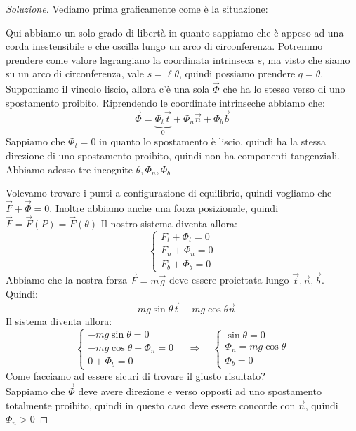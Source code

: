 \documentclass[11pt,a4paper,twoside]{article}
\theoremstyle{definition}
\newenvironment{sol}
	{\renewcommand\qedsymbol{$\blacksquare$}\begin{proof}[Soluzione]}
	{\end{proof}}
\begin{document}
\begin{sol}
	Vediamo prima graficamente come è la situazione:
	\begin{center}
	\end{center}
	Qui abbiamo un solo grado di libertà in quanto sappiamo che è appeso ad una corda inestensibile e che oscilla lungo un arco di circonferenza. Potremmo prendere come valore lagrangiano la coordinata intrinseca $s$, ma visto che siamo su un arco di circonferenza, vale $s = \ell \theta$, quindi possiamo prendere $q = \theta$. Supponiamo il vincolo liscio, allora c'è una sola $\vec \Phi$ che ha lo stesso verso di uno spostamento proibito. Riprendendo le coordinate intrinseche abbiamo che:
	\[ \vec \Phi = \underbrace{\Phi_t \vec t}_0 + \Phi_n \vec n + \Phi_b \vec b \]
	Sappiamo che $\Phi_t = 0$ in quanto lo spostamento è liscio, quindi ha la stessa direzione di uno spostamento proibito, quindi non ha componenti tangenziali. Abbiamo adesso tre incognite $\theta, \Phi_n, \Phi_b$

	Volevamo trovare i punti a configurazione di equilibrio, quindi vogliamo che $\vec F + \vec \Phi = 0$. Inoltre abbiamo anche una forza posizionale, quindi $\vec F = \vec F(P) = \vec F(\theta)$
	Il nostro sistema diventa allora:
	\[ \begin{cases}
		F_t + \Phi_t = 0\\
		F_n + \Phi_n = 0\\
		F_b + \Phi_b = 0
	\end{cases} \]
	Abbiamo che la nostra forza $\vec F = m\vec g$ deve essere proiettata lungo $\vec t, \vec n, \vec b$. Quindi:
	\[ -mg \sin \theta \vec t - mg \cos \theta \vec n \]
	Il sistema diventa allora:
	\[ \begin{cases}
		-mg\sin \theta = 0\\
		-mg \cos \theta + \Phi_n = 0\\
		0 + \Phi_b = 0
	\end{cases} \quad \Rightarrow \quad
	\begin{cases}
		\sin \theta = 0\\
		\Phi_n = mg \cos \theta\\
		\Phi_b =0
	\end{cases}\]
	Come facciamo ad essere sicuri di trovare il giusto risultato?\\
	Sappiamo che $\vec \Phi$ deve avere direzione e verso opposti ad uno spostamento totalmente proibito, quindi in questo caso deve essere concorde con $\vec n$, quindi $\Phi_n>0$


\end{sol}
\end{document}
